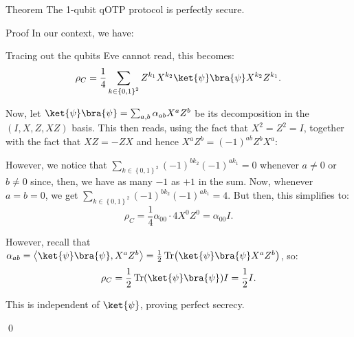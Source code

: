 \documentclass[a4paper]{article}
\begin{document}
\begin{parag}{Theorem}
    The 1-qubit qOTP protocol is perfectly secure.

    \begin{subparag}{Proof}
        In our context, we have: 

        Tracing out the qubits Eve cannot read, this becomes: 
        \[\rho_C = \frac{1}{4} \sum_{k \in \left\{0, 1\right\}^2} Z^{k_1} X^{k_2} \ket{\psi}\bra{\psi} X^{k_2} Z^{k_1}.\]
        
        Now, let $\ket{\psi}\bra{\psi} = \sum_{a, b} \alpha_{ab} X^a Z^b$ be its decomposition in the $\left(I, X, Z, XZ\right)$ basis. This then reads, using the fact that $X^2 = Z^2 = I$, together with the fact that $XZ = -ZX$ and hence $X^a Z^b = \left(-1\right)^{ab} Z^b X^a$:

        However, we notice that $\sum_{k \in \left\{0, 1\right\}^2} \left(-1\right)^{b k_2} \left(-1\right)^{a k_1} = 0$ whenever $a \neq 0$ or $b \neq 0$ since, then, we have as many $-1$ as $+1$ in the sum. Now, whenever $a = b = 0$, we get $\sum_{k \in \left\{0, 1\right\}^2} \left(-1\right)^{b k_2} \left(-1\right)^{a k_1} = 4$. But then, this simplifies to: 
        \[\rho_C = \frac{1}{4} \alpha_{00} \cdot 4 X^0 Z^0 = \alpha_{00} I.\]
        
        However, recall that $\alpha_{ab} = \left\langle \ket{\psi}\bra{\psi}, X^a Z^b \right\rangle = \frac{1}{2}\Tr\left(\ket{\psi}\bra{\psi} X^a Z^b\right)$, so: 
        \[\rho_C = \frac{1}{2}\Tr\left(\ket{\psi}\bra{\psi}\right)I = \frac{1}{2} I.\]
        
        This is independent of $\ket{\psi}$, proving perfect secrecy. 

        \qed
    \end{subparag}
\end{parag}
\end{document}
